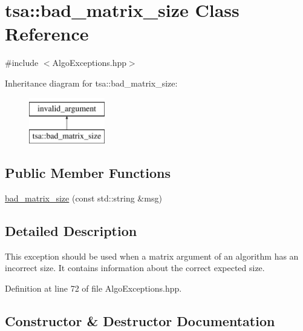 \hypertarget{classtsa_1_1bad__matrix__size}{}\section{tsa\+:\+:bad\+\_\+matrix\+\_\+size Class Reference}
\label{classtsa_1_1bad__matrix__size}


{\ttfamily \#include $<$Algo\+Exceptions.\+hpp$>$}

Inheritance diagram for tsa\+:\+:bad\+\_\+matrix\+\_\+size\+:\begin{figure}[H]
\begin{center}
\leavevmode
\includegraphics[height=2.000000cm]{classtsa_1_1bad__matrix__size}
\end{center}
\end{figure}
\subsection*{Public Member Functions}
\begin{DoxyCompactItemize}
\item 
\hyperlink{classtsa_1_1bad__matrix__size_a5d06e7b24038b0b1ff07a0fa308f8e54}{bad\+\_\+matrix\+\_\+size} (const std\+::string \&msg)
\end{DoxyCompactItemize}


\subsection{Detailed Description}
This exception should be used when a matrix argument of an algorithm has an incorrect size. It contains information about the correct expected size. 

Definition at line 72 of file Algo\+Exceptions.\+hpp.



\subsection{Constructor \& Destructor Documentation}
\mbox{\label{classtsa_1_1bad__matrix__size_a5d06e7b24038b0b1ff07a0fa308f8e54}} 

